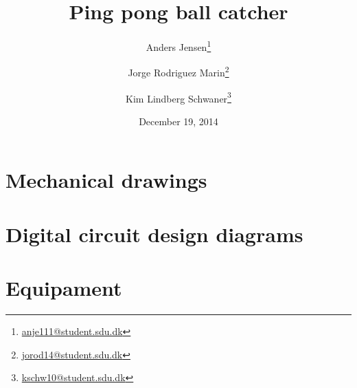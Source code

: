 \documentclass[]{report}
\title{Ping pong ball catcher}
\date{December 19, 2014}
\author{Anders Jensen\thanks{\url{anje111@student.sdu.dk}}}
\author{Jorge Rodriguez Marin\thanks{\url{jorod14@student.sdu.dk}}}
\author{Kim Lindberg Schwaner\thanks{\url{kschw10@student.sdu.dk}}}
\affil{University of Southern Denmark\\Faculty of Engineering\\EMB1}
\begin{document}
	\maketitle
	
	\tableofcontents
	
	
	
	
	
	
	
	
	

	\nocite{*} %
	\printbibliography[heading=bibintoc]

	\appendix
		\chapter{Mechanical drawings}
			

		\chapter{Digital circuit design diagrams}\label{cha:digi-diagrams}
			
			

		\chapter{Equipament}
		\label{cha:equipament}
			
\end{document}
